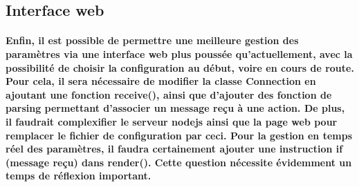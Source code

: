 \documentclass[a4paper]{article}
\begin{document}
\subsection{Interface web} \paragraph{Enfin, il est possible de permettre une
meilleure gestion des paramètres via une interface web plus poussée
qu’actuellement, avec la possibilité de choisir la configuration au début, voire
en cours de route. Pour cela, il sera nécessaire de modifier la classe
Connection en ajoutant une fonction receive(), ainsi que d’ajouter des fonction
de parsing permettant d’associer un message reçu à une action. De plus, il
faudrait complexifier le serveur nodejs ainsi que la page web pour remplacer le
fichier de configuration par ceci. Pour la gestion en temps réel des paramètres,
il faudra certainement ajouter une instruction if (message reçu) dans render().
Cette question nécessite évidemment un temps de réflexion important.}
\end{document}
